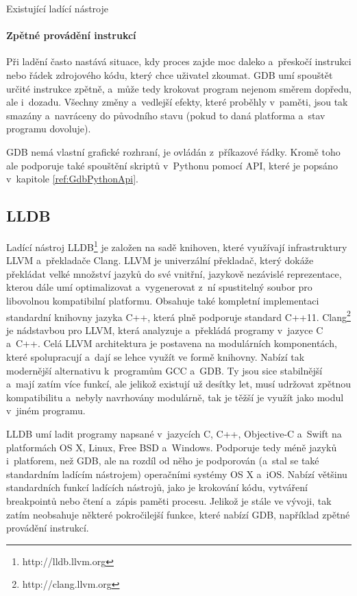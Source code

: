 \documentclass[czech,bachelor,male,python,dept460,hidelinks]{diploma}						%
\newcommand{\parspace}[1][]{
	\ifthenelse{\isempty{#1}}{\vspace{0mm}}{\vspace{#1}}
	\par
}
\begin{document}
\begin{section}{Existující ladící nástroje}
		\paragraph*{Zpětné provádění instrukcí}
			Při ladění často nastává situace, kdy proces zajde moc daleko a~přeskočí instrukci nebo řádek zdrojového kódu, který chce uživatel zkoumat.
			GDB umí spouštět určité instrukce zpětně, a~může tedy krokovat program nejenom směrem dopředu, ale i~dozadu.
			Všechny změny a~vedlejší efekty, které proběhly v~paměti, jsou tak smazány a~navráceny do původního stavu (pokud to daná platforma a~stav programu dovoluje).
		
		\parspace GDB nemá vlastní grafické rozhraní, je ovládán z~příkazové řádky. Kromě toho ale podporuje také spouštění skriptů v~Pythonu pomocí API,
		které je popsáno v~kapitole \ref{ref:GdbPythonApi}.
	\subsection{LLDB}
		Ladící nástroj LLDB\footnote{http://lldb.llvm.org} je založen na sadě knihoven, které využívají infrastruktury LLVM a~překladače Clang.
		LLVM je univerzální překladač, který dokáže překládat velké množství jazyků do své vnitřní, jazykově nezávislé reprezentace, kterou dále umí
		optimalizovat a~vygenerovat z~ní spustitelný soubor pro libovolnou kompatibilní platformu. Obsahuje také kompletní implementaci standardní
		knihovny jazyka C++, která plně podporuje standard C++11. Clang\footnote{http://clang.llvm.org} je nádstavbou pro LLVM, která analyzuje
		a~překládá programy v~jazyce C a~C++. Celá LLVM architektura je postavena na modulárních komponentách, které spolupracují a~dají se lehce využít ve
		formě knihovny. Nabízí tak modernější alternativu k~programům GCC a~GDB. Ty jsou sice stabilnější a~mají zatím více funkcí, ale jelikož existují už
		desítky let, musí udržovat zpětnou kompatibilitu a~nebyly navrhovány modulárně, tak je těžší je využít jako modul v~jiném programu.
		
		\parspace LLDB umí ladit programy napsané v~jazycích C, C++, Objective-C a~Swift na platformách OS X, Linux, Free BSD a~Windows. Podporuje tedy méně jazyků
		i~platforem, než GDB, ale na rozdíl od něho je podporován (a~stal se také standardním ladícím nástrojem) operačními systémy OS X a~iOS.
		Nabízí většinu standardních funkcí ladících nástrojů, jako je krokování kódu, vytváření breakpointů nebo čtení a~zápis paměti procesu.
		Jelikož je stále ve vývoji, tak zatím neobsahuje některé pokročilejší funkce, které nabízí GDB, například zpětné provádění instrukcí.


\end{section}
\end{document}
